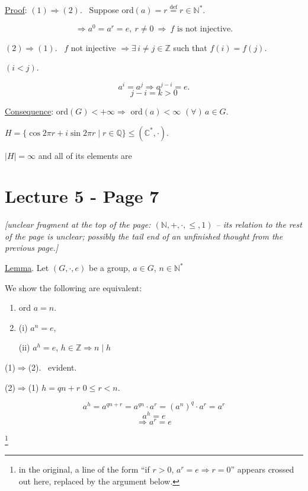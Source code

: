 \bigskip
\noindent\underline{Proof}: $(1)\Rightarrow(2)$. \ Suppose ord$(a)=r \overset{\text{def}}{=} r\in\mathbb{N}^*$.

\[
\Rightarrow a^0=a^r=e, \ r\neq 0 \ \Rightarrow \ f \text{ is not injective.}
\]

\bigskip
\noindent $(2)\Rightarrow(1)$. \ $f$ not injective $\Rightarrow \exists\, i\neq j\in\mathbb{Z}$ such that $f(i)=f(j)$.

\noindent $(i<j)$.

\[
a^i=a^j \Rightarrow a^{j-i}=e.
\]
\[
j-i=k>0
\]

\bigskip
\noindent\underline{Consequence}: ord$(G)<+\infty \Rightarrow$ ord$(a)<\infty$ $(\forall)\,a\in G$.

\bigskip
\noindent $H=\{\cos 2\pi r+i\sin 2\pi r \mid r\in\mathbb{Q}\} \leq (\mathbb{C}^*,\cdot)$.

\noindent $|H|=\infty$ and all of its elements are



\section*{Lecture 5 - Page 7}

\noindent\textit{[unclear fragment at the top of the page: $(\mathbb{N},+,\cdot,\leq,1)$ -- its relation to the rest of the page is unclear; possibly the tail end of an unfinished thought from the previous page.]}

\bigskip
\noindent\underline{Lemma}. Let $(G,\cdot,e)$ be a group, $a\in G$, $n\in\mathbb{N}^*$

\noindent We show the following are equivalent:

\begin{enumerate}
\item[(1)] ord $a=n$.
\item[(2)] (i) $a^n=e$,

\noindent (ii) $a^h=e$, $h\in\mathbb{Z} \Rightarrow n\mid h$
\end{enumerate}

\bigskip
\noindent (1)$\Rightarrow$(2). \ evident.

\bigskip
\noindent (2)$\Rightarrow$(1) \quad $h=qn+r$ \quad $0\leq r<n$.

\[
a^h = a^{qn+r} = a^{qn}\cdot a^r = (a^n)^q\cdot a^r = a^r
\]
\[
a^h=e
\]
\[
\Rightarrow a^r=e
\]

\noindent\footnote{in the original, a line of the form ``if $r>0$, $a^r=e\Rightarrow r=0$'' appears crossed out here, replaced by the argument below.}

